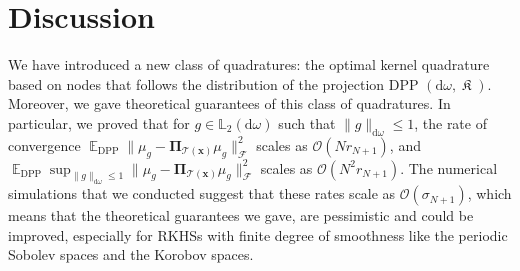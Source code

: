 \documentclass[twoside,11pt]{book}
\newtheorem{theorem}{Theorem}
\numberwithin{theorem}{chapter}
\numberwithin{definition}{chapter}
\numberwithin{proposition}{chapter}
\numberwithin{corollary}{chapter}
\numberwithin{example}{chapter}
\numberwithin{lemma}{chapter}
\numberwithin{assumption}{chapter}
\numberwithin{equation}{chapter}
\numberwithin{figure}{chapter}
\DeclareMathOperator{\DPP}{\mathrm{DPP}}
\DeclareMathOperator{\EX}{\mathbb{E}}
\DeclareMathOperator*{\KDPP}{\mathfrak{K}}
\DeclareMathOperator{\F}{\mathcal{F}}
\DeclareMathOperator{\Ns}{\mathbb{N}^{*}}
\begin{document}
\section{Discussion}
\label{s:discussion}





We have introduced a new class of quadratures: the optimal kernel quadrature based on nodes that follows the distribution of the projection DPP $(\mathrm{d}\omega, \KDPP)$. Moreover, we gave theoretical guarantees of this class of quadratures. In particular, we proved that for $g \in \mathbb{L}_{2}(\mathrm{d}\omega)$ such that $\|g\|_{\mathrm{d}\omega} \leq 1$, the rate of convergence $\EX_{\DPP} \|\mu_{g} - \bm{\Pi}_{\mathcal{T}(\bm{x})} \mu_{g}\|_{\F}^{2}$ scales as $\mathcal{O}(Nr_{N+1})$, and $\EX_{\DPP} \sup_{\|g\|_{\mathrm{d}\omega} \leq 1}\|\mu_{g} - \bm{\Pi}_{\mathcal{T}(\bm{x})} \mu_{g}\|_{\F}^{2}$ scales as $\mathcal{O}(N^{2}r_{N+1})$. The numerical simulations that we conducted suggest that these rates scale as $\mathcal{O}(\sigma_{N+1})$, which means that the theoretical guarantees we gave, are pessimistic and could be improved, especially for RKHSs with finite degree of smoothness like the periodic Sobolev spaces and the Korobov spaces.
\end{document}
